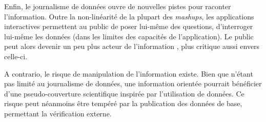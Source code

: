 Enfin, le journalisme de données ouvre de nouvelles pistes pour raconter l'information.
Outre la non-linéarité de la plupart des \textit{mashups}, les applications interactives
permettent au public de poser lui-même des questions, d'interroger lui-même les données 
(dans les limites des capacités de l'application). Le public peut alors devenir un peu 
plus \og acteur de l'information \fg, plus critique aussi envers celle-ci.

A contrario, le risque de manipulation de l'information existe. Bien que n'étant pas 
limité au journalisme de données, une information orientée pourrait bénéficier
d'une pseudo-couverture scientifique inspirée par l'utilisation de données. Ce
risque peut néanmoins être tempéré par la publication des données de base, permettant la 
vérification externe.

